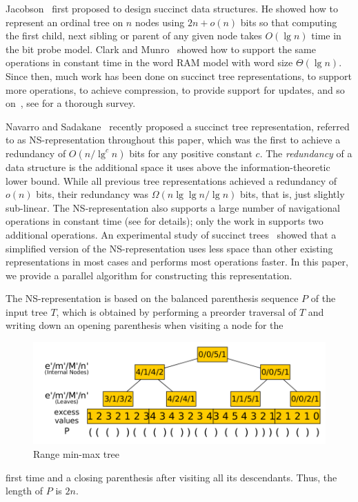 Jacobson~\cite{j1989} first proposed to design succinct data
structures.  He showed how to represent an ordinal tree on $n$ nodes
using $2n+o(n)$ bits so that computing the first child, next sibling
or parent of any given node takes $O(\lg n)$ time in the bit probe
model.  Clark and Munro~\cite{cm1996} showed how to support the same
operations in constant time in the word RAM model with word size
$\Theta(\lg n)$.  Since then, much work has been done on succinct tree
representations, to support more operations, to achieve compression,
to provide support for updates, and so
on~\cite{mr1997,bdmr1999,grr2004,jss2007,ly2008,hms2012,fm2014,Navarro:2014:FFS:2620785.2601073},
see \cite{rr2013} for a thorough survey.

Navarro and Sadakane~\cite{Navarro:2014:FFS:2620785.2601073} recently
proposed a succinct tree representation, referred to as
NS-representation throughout this paper, which was the first to
achieve a redundancy of $O(n/\lg^c n)$ bits for any positive constant
$c$.  The \emph{redundancy} of a data structure is the additional
space it uses above the information-theoretic lower bound.  While all
previous tree representations achieved a redundancy of $o(n)$ bits,
their redundancy was $\Omega(n \lg\lg n / \lg n)$ bits, that is, just
slightly sub-linear.  The NS-representation also supports a large
number of navigational operations in constant time (see
\cite{Navarro:2014:FFS:2620785.2601073} for details); only the work in
\cite{hms2012,fm2014} supports two additional operations.  An
experimental study of succinct trees~\cite{ACNSalenex10} showed that a
simplified version of the NS-representation uses less space than other
existing representations in most cases and performs most operations
faster.  In this paper, we provide a parallel algorithm for
constructing this representation.

The NS-representation is based on the balanced parenthesis sequence
$P$ of the input tree $T$, which is obtained by performing a preorder
traversal of $T$ and writing down an opening parenthesis when visiting a node for the 
\begin{figure}
\centering
   \includegraphics[scale=0.28]{./images/Range-min-max-tree.png}
   \caption{Range min-max tree}
   \label{fig:RangeMinMaxTree}
\vspace{-20pt}
\end{figure}
first time and a closing parenthesis after visiting all
its descendants.  Thus, the length of $P$ is $2n$.

